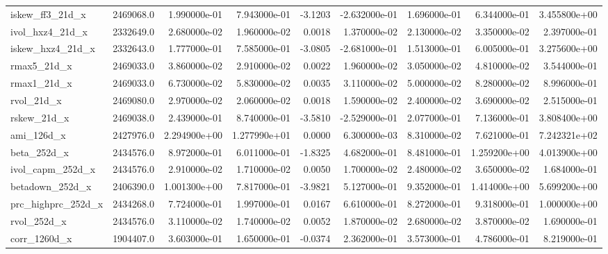 \documentclass[10pt]{article}
\begin{document}
\begin{landscape}
\begin{longtable}{|l|r|r|r|r|r|r|r|r|}
iskew\_ff3\_21d\_x         &  2469068.0 &  1.990000e-01 &  7.943000e-01 &     -3.1203 & -2.632000e-01 &  1.696000e-01 &  6.344000e-01 &  3.455800e+00 \\
ivol\_hxz4\_21d\_x         &  2332649.0 &  2.680000e-02 &  1.960000e-02 &      0.0018 &  1.370000e-02 &  2.130000e-02 &  3.350000e-02 &  2.397000e-01 \\
iskew\_hxz4\_21d\_x        &  2332643.0 &  1.777000e-01 &  7.585000e-01 &     -3.0805 & -2.681000e-01 &  1.513000e-01 &  6.005000e-01 &  3.275600e+00 \\
rmax5\_21d\_x             &  2469033.0 &  3.860000e-02 &  2.910000e-02 &      0.0022 &  1.960000e-02 &  3.050000e-02 &  4.810000e-02 &  3.544000e-01 \\
rmax1\_21d\_x             &  2469033.0 &  6.730000e-02 &  5.830000e-02 &      0.0035 &  3.110000e-02 &  5.000000e-02 &  8.280000e-02 &  8.996000e-01 \\
rvol\_21d\_x              &  2469080.0 &  2.970000e-02 &  2.060000e-02 &      0.0018 &  1.590000e-02 &  2.400000e-02 &  3.690000e-02 &  2.515000e-01 \\
rskew\_21d\_x             &  2469038.0 &  2.439000e-01 &  8.740000e-01 &     -3.5810 & -2.529000e-01 &  2.077000e-01 &  7.136000e-01 &  3.808400e+00 \\
ami\_126d\_x              &  2427976.0 &  2.294900e+00 &  1.277990e+01 &      0.0000 &  6.300000e-03 &  8.310000e-02 &  7.621000e-01 &  7.242321e+02 \\
beta\_252d\_x             &  2434576.0 &  8.972000e-01 &  6.011000e-01 &     -1.8325 &  4.682000e-01 &  8.481000e-01 &  1.259200e+00 &  4.013900e+00 \\
ivol\_capm\_252d\_x        &  2434576.0 &  2.910000e-02 &  1.710000e-02 &      0.0050 &  1.700000e-02 &  2.480000e-02 &  3.650000e-02 &  1.684000e-01 \\
betadown\_252d\_x         &  2406390.0 &  1.001300e+00 &  7.817000e-01 &     -3.9821 &  5.127000e-01 &  9.352000e-01 &  1.414000e+00 &  5.699200e+00 \\
prc\_highprc\_252d\_x      &  2434268.0 &  7.724000e-01 &  1.997000e-01 &      0.0167 &  6.610000e-01 &  8.272000e-01 &  9.318000e-01 &  1.000000e+00 \\
rvol\_252d\_x             &  2434576.0 &  3.110000e-02 &  1.740000e-02 &      0.0052 &  1.870000e-02 &  2.680000e-02 &  3.870000e-02 &  1.690000e-01 \\
corr\_1260d\_x            &  1904407.0 &  3.603000e-01 &  1.650000e-01 &     -0.0374 &  2.362000e-01 &  3.573000e-01 &  4.786000e-01 &  8.219000e-01 \\

\end{longtable}
\end{landscape}
\end{document}
